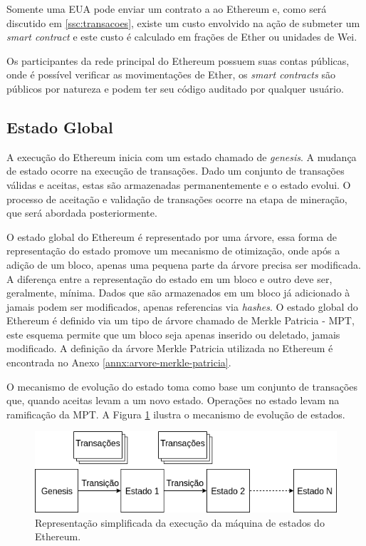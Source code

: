 \documentclass[tcc,capa]{texufpel}
\begin{document}
	Somente uma EUA pode enviar um contrato a ao Ethereum e, como será discutido em \ref{ssc:transacoes}, existe um custo envolvido na ação de submeter um \textit{smart contract} e este custo é calculado em frações de Ether ou unidades de Wei.
	
	Os participantes da rede principal do Ethereum possuem suas contas públicas, onde é possível verificar as movimentações de Ether, os \textit{smart contracts} são públicos por natureza e podem ter seu código auditado por qualquer usuário.

	
	\subsection{Estado Global}\label{ssc:estado-global}
	
	A execução do Ethereum inicia com um estado chamado de \textit{genesis}. A mudança de estado ocorre na execução de transações. Dado um conjunto de transações válidas e aceitas, estas são armazenadas permanentemente e o estado evolui. O processo de aceitação e validação de transações ocorre na etapa de mineração, que será abordada posteriormente.

	O estado global do Ethereum é representado por uma árvore, essa forma de representação do estado promove um mecanismo de otimização, onde após a adição de um bloco, apenas uma pequena parte da árvore precisa ser modificada. A diferença entre a representação do estado em um bloco e outro deve ser, geralmente, mínima. Dados que são armazenados em um bloco já adicionado à \bchain jamais podem ser modificados, apenas referencias via \textit{hashes}. O estado global do Ethereum é definido via um tipo de árvore chamado de Merkle Patricia - MPT, este esquema permite que um bloco seja apenas inserido ou deletado, jamais modificado. A definição da árvore Merkle Patricia utilizada no Ethereum é encontrada no Anexo \ref{annx:arvore-merkle-patricia}.
	
	O mecanismo de evolução do estado toma como base um conjunto de transações que, quando aceitas levam a um novo estado. Operações no estado levam na ramificação da MPT. A Figura \ref{fig:estado-global-ethereum} ilustra o mecanismo de evolução de estados. 
	
	\begin{figure}
        \centering
        \includegraphics[width=15cm]{imagens/estado-global-ethereum.png}
        \caption{Representação simplificada da execução da máquina de estados do Ethereum.}
        \label{fig:estado-global-ethereum}
    \end{figure}
    
\end{document}
